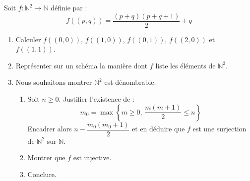 \documentclass[a4paper,10pt]{report}
\begin{document}
\begin{Exercice}{} Soit $f : \mathbb{N}^2 \rightarrow \mathbb{N}$ définie par :
$$ f((p,q)) = \frac{(p+q)(p+q+1)}{2} + q$$
\begin{enumerate}
\item Calculer $f((0,0))$, $f((1,0))$, $f((0,1))$, $f((2,0))$ et $f((1,1))$.
\item Représenter sur un schéma la manière dont $f$ liste les éléments de $\mathbb{N}^2$.
\item Nous souhaitons montrer $\mathbb{N}^2$ est dénombrable. 
\begin{enumerate}
\item Soit $n \geq 0$. Justifier l'existence de :
$$ m_0 = \max \left\lbrace m \geq 0, \, \frac{m(m+1)}{2} \leq n \right\rbrace$$
Encadrer alors $n-\dfrac{m_0(m_0+1)}{2}$ et en déduire que $f$ est une surjection de $\mathbb{N}^2$ sur $\mathbb{N}$.
\item Montrer que $f$ est injective.
\item Conclure.
\end{enumerate}
\end{enumerate}
\end{Exercice}
\end{document}
